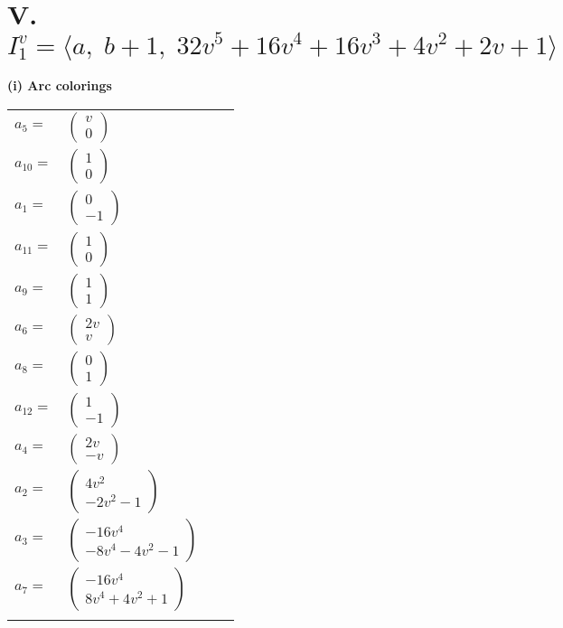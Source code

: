 \documentclass[1p]{elsarticle_modified}
\theoremstyle{definition}
\begin{document}
\centering \section*{V. $I^v_{1}= \langle a,\;b+1,\;32 v^5+16 v^4+16 v^3+4 v^2+2 v+1 \rangle$}
\flushleft \textbf{(i) Arc colorings}\\
\begin{tabular}{m{7pt} m{180pt} m{7pt} m{180pt} }
\flushright $a_{5}=$&$\begin{pmatrix}v\\0\end{pmatrix}$ \\
\flushright $a_{10}=$&$\begin{pmatrix}1\\0\end{pmatrix}$ \\
\flushright $a_{1}=$&$\begin{pmatrix}0\\-1\end{pmatrix}$ \\
\flushright $a_{11}=$&$\begin{pmatrix}1\\0\end{pmatrix}$ \\
\flushright $a_{9}=$&$\begin{pmatrix}1\\1\end{pmatrix}$ \\
\flushright $a_{6}=$&$\begin{pmatrix}2 v\\v\end{pmatrix}$ \\
\flushright $a_{8}=$&$\begin{pmatrix}0\\1\end{pmatrix}$ \\
\flushright $a_{12}=$&$\begin{pmatrix}1\\-1\end{pmatrix}$ \\
\flushright $a_{4}=$&$\begin{pmatrix}2 v\\- v\end{pmatrix}$ \\
\flushright $a_{2}=$&$\begin{pmatrix}4 v^2\\-2 v^2-1\end{pmatrix}$ \\
\flushright $a_{3}=$&$\begin{pmatrix}-16 v^4\\-8 v^4-4 v^2-1\end{pmatrix}$ \\
\flushright $a_{7}=$&$\begin{pmatrix}-16 v^4\\8 v^4+4 v^2+1\end{pmatrix}$\\&\end{tabular}
\end{document}
